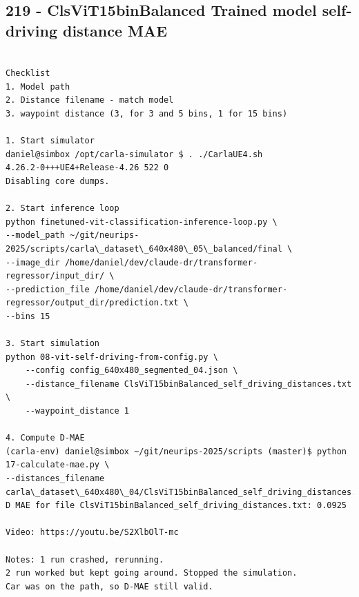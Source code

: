 \subsection{219 - ClsViT15binBalanced Trained model self-driving distance MAE}
\label{app_res:219}
\begin{verbatim}

Checklist
1. Model path
2. Distance filename - match model
3. waypoint distance (3, for 3 and 5 bins, 1 for 15 bins)

1. Start simulator
daniel@simbox /opt/carla-simulator $ . ./CarlaUE4.sh 
4.26.2-0+++UE4+Release-4.26 522 0
Disabling core dumps.

2. Start inference loop
python finetuned-vit-classification-inference-loop.py \
--model_path ~/git/neurips-2025/scripts/carla\_dataset\_640x480\_05\_balanced/final \
--image_dir /home/daniel/dev/claude-dr/transformer-regressor/input_dir/ \
--prediction_file /home/daniel/dev/claude-dr/transformer-regressor/output_dir/prediction.txt \
--bins 15

3. Start simulation
python 08-vit-self-driving-from-config.py \
    --config config_640x480_segmented_04.json \
    --distance_filename ClsViT15binBalanced_self_driving_distances.txt \
    --waypoint_distance 1

4. Compute D-MAE
(carla-env) daniel@simbox ~/git/neurips-2025/scripts (master)$ python 17-calculate-mae.py \
--distances_filename carla\_dataset\_640x480\_04/ClsViT15binBalanced_self_driving_distances.txt
D MAE for file ClsViT15binBalanced_self_driving_distances.txt: 0.0925

Video: https://youtu.be/S2XlbOlT-mc

Notes: 1 run crashed, rerunning.
2 run worked but kept going around. Stopped the simulation.
Car was on the path, so D-MAE still valid.

\end{verbatim}

